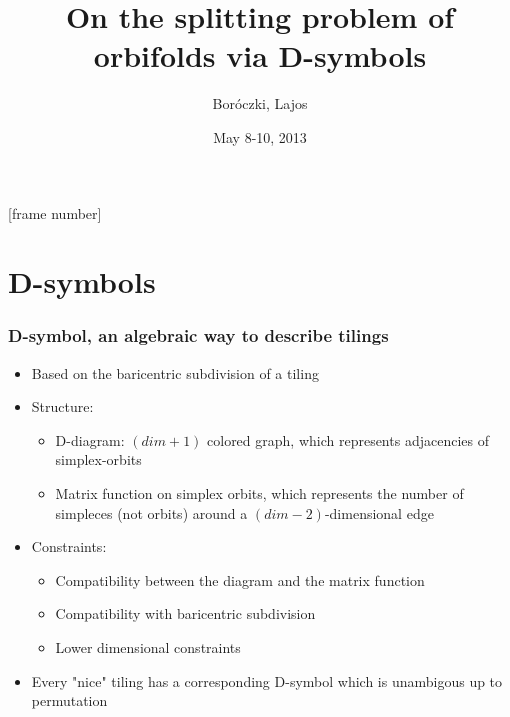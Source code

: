 \usepackage[utf8]{inputenc}
\usepackage{graphicx}
\usepackage{listings}
\usepackage{amsmath}
\usepackage{amssymb}
\usepackage{ae,aecompl}
\usepackage{fix-cm}
\usepackage{hyperref}

\beamertemplatenavigationsymbolsempty
\beamertemplatetextbibitems
{}[frame number]

\newcommand{\leftexp}[2]{{\vphantom{#2}}^{#1}{#2}}

\title{On the splitting problem of orbifolds via D-symbols}
\author{Boróczki, Lajos}
\date{May 8-10, 2013}



\begin{frame}
  \maketitle
\end{frame}

\begin{frame}
  \tableofcontents
\end{frame}
\newpage

\section{D-symbols}
\begin{frame}
  \frametitle{D-symbol, an algebraic way to describe tilings}
  \begin{itemize}
    \item Based on the baricentric subdivision of a tiling
    \item Structure:
      \begin{itemize}
	\item D-diagram: $(dim+1)$ colored graph, which represents adjacencies of
	  simplex-orbits
	\item Matrix function on simplex orbits, which represents the number of
	  simpleces (not orbits) around a $(dim-2)$-dimensional edge
      \end{itemize}
    \item Constraints:
      \begin{itemize}
	\item Compatibility between the diagram and the matrix function
	\item Compatibility with baricentric subdivision
	\item Lower dimensional constraints
      \end{itemize}
    \item Every "nice" tiling has a corresponding D-symbol which is unambigous
      up to permutation 
  \end{itemize}
\end{frame}

